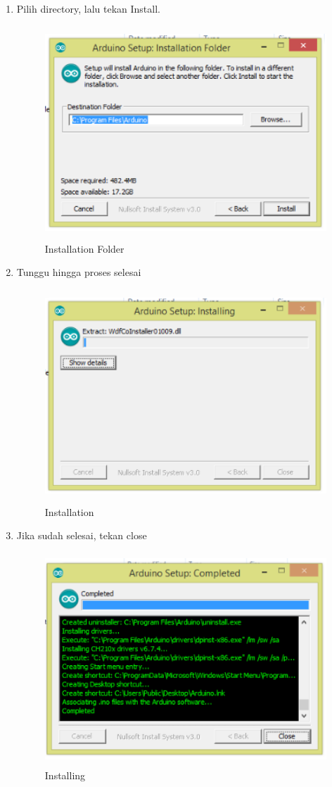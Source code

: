 \begin{enumerate}
\item Pilih directory, lalu tekan Install.
\begin{figure}[!htbp]
  \centering
  \includegraphics[height=8cm]{figures/5/1174076/Teori/3.PNG}
  \caption{Installation Folder}
\end{figure}

\item Tunggu hingga proses selesai
\begin{figure}[!htbp]
  \centering
  \includegraphics[height=8cm]{figures/5/1174076/Teori/4.PNG}
  \caption{Installation }
\end{figure}

\item Jika sudah selesai, tekan close
\begin{figure}[!htbp]
  \centering
  \includegraphics[height=8cm]{figures/5/1174076/Teori/5.PNG}
  \caption{Installing}
\end{figure}
\end{enumerate}

